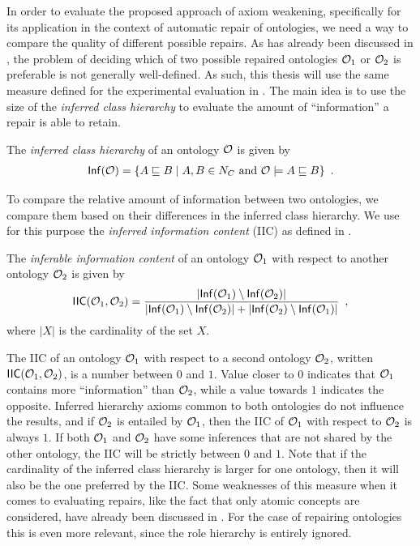 
In order to evaluate the proposed approach of axiom weakening, specifically for its application in the context of automatic repair of ontologies, we need a way to compare the quality of different possible repairs. As has already been discussed in \cite{troquard2018repairing}, the problem of deciding which of two possible repaired ontologies $\mathcal{O}_1$ or $\mathcal{O}_2$ is preferable is not generally well-defined. As such, this thesis will use the same measure defined for the experimental evaluation in \cite{troquard2018repairing}. The main idea is to use the size of the \emph{inferred class hierarchy} to evaluate the amount of ``information'' a repair is able to retain.

\begin{definition}
  The \emph{inferred class hierarchy} of an ontology $\mathcal{O}$ is given by
  \begin{align*}
    {\ensuremath{\mathsf{Inf}}}(\mathcal{O}) = \{ A \sqsubseteq B \mid A, B \in N_C \text{ and } \mathcal{O} \models A \sqsubseteq B \} \enspace.
  \end{align*}
\end{definition}

To compare the relative amount of information between two ontologies, we compare them based on their differences in the inferred class hierarchy. We use for this purpose the \emph{inferred information content} (IIC) as defined in \cite{troquard2018repairing}.

\begin{definition}
  The \emph{inferable information content} of an ontology $\mathcal{O}_1$ with respect to another ontology $\mathcal{O}_2$ is given by
  \begin{align*}
    {\ensuremath{\mathsf{IIC}}}(\mathcal{O}_1, \mathcal{O}_2) = \frac{| {\mathsf{Inf}}(\mathcal{O}_1) \setminus {\ensuremath{\mathsf{Inf}}}(\mathcal{O}_2) |}{|{\mathsf{Inf}}(\mathcal{O}_1) \setminus {\ensuremath{\mathsf{Inf}}}(\mathcal{O}_2)| + |{\mathsf{Inf}}(\mathcal{O}_2) \setminus {\ensuremath{\mathsf{Inf}}}(\mathcal{O}_1)|} \enspace,
  \end{align*}
  where $|X|$ is the cardinality of the set $X$.
\end{definition}

The IIC of an ontology $\mathcal{O}_1$ with respect to a second ontology $\mathcal{O}_2$, written ${\mathsf{IIC}}(\mathcal{O}_1, \mathcal{O}_2)$, is a number between $0$ and $1$. Value closer to $0$ indicates that $\mathcal{O}_1$ contains more ``information'' than $\mathcal{O}_2$, while a value towards $1$ indicates the opposite. Inferred hierarchy axioms common to both ontologies do not influence the results, and if $\mathcal{O}_2$ is entailed by $\mathcal{O}_1$, then the IIC of $\mathcal{O}_1$ with respect to $\mathcal{O}_2$ is always $1$. If both $\mathcal{O}_1$ and $\mathcal{O}_2$ have some inferences that are not shared by the other ontology, the IIC will be strictly between $0$ and $1$. Note that if the cardinality of the inferred class hierarchy is larger for one ontology, then it will also be the one preferred by the IIC. Some weaknesses of this measure when it comes to evaluating repairs, like the fact that only atomic concepts are considered, have already been discussed in \cite{troquard2018repairing}. For the case of repairing \SROIQ ontologies this is even more relevant, since the role hierarchy is entirely ignored.

